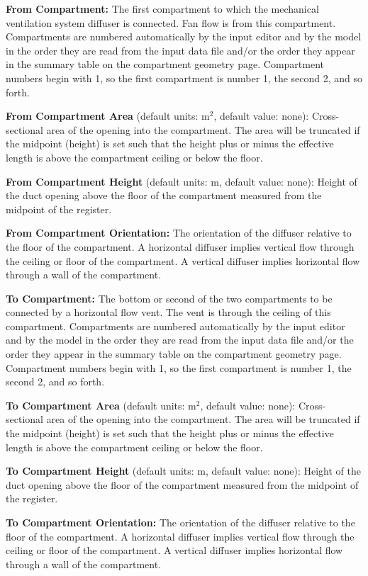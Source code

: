 \textbf{From Compartment:} The first compartment to which the mechanical ventilation system diffuser is connected. Fan flow is from this compartment.  Compartments are numbered automatically by the input editor and by the model in the order they are read from the input data file and/or the order they appear in the summary table on the compartment geometry page. Compartment numbers begin with 1, so the first compartment is number 1, the second 2, and so forth.

\textbf{From Compartment Area} (default units: m$^2$, default value: none): Cross-sectional area of the opening into the compartment. The area will be truncated if the midpoint (height) is set such that the height plus or minus the effective length is above the compartment ceiling or below the floor.

\textbf{From Compartment Height} (default units: m, default value: none): Height of the duct opening above the floor of the compartment measured from the midpoint of the register.

\textbf{From Compartment Orientation:} The orientation of the diffuser relative to the floor of the compartment.  A horizontal diffuser implies vertical flow through the ceiling or floor of the compartment.  A vertical diffuser implies horizontal flow through a wall of the compartment.

\textbf{To Compartment:} The bottom or second of the two compartments to be connected by a horizontal flow vent. The vent is through the ceiling of this compartment. Compartments are numbered automatically by the input editor and by the model in the order they are read from the input data file and/or the order they appear in the summary table on the compartment geometry page. Compartment numbers begin with 1, so the first compartment is number 1, the second 2, and so forth.

\textbf{To Compartment Area} (default units: m$^2$, default value: none): Cross-sectional area of the opening into the compartment. The area will be truncated if the midpoint (height) is set such that the height plus or minus the effective length is above the compartment ceiling or below the floor.

\textbf{To Compartment Height} (default units: m, default value: none): Height of the duct opening above the floor of the compartment measured from the midpoint of the register.

\textbf{To Compartment Orientation:} The orientation of the diffuser relative to the floor of the compartment.  A horizontal diffuser implies vertical flow through the ceiling or floor of the compartment.  A vertical diffuser implies horizontal flow through a wall of the compartment.

